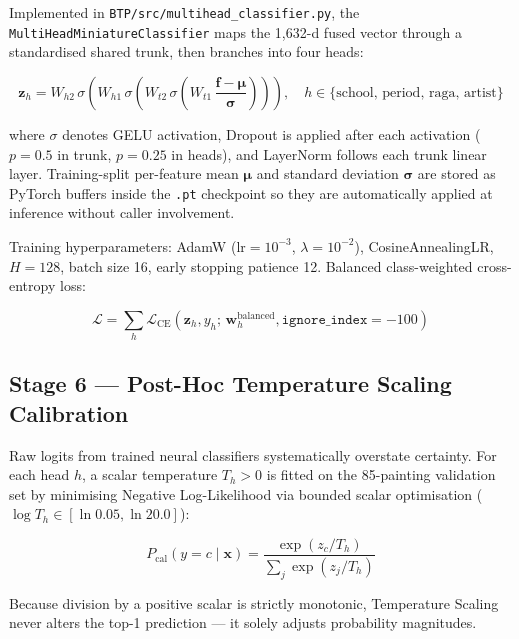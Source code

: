 \documentclass[12pt, a4paper, twoside]{article}
\begin{document}
Implemented in \texttt{BTP/src/multihead\_classifier.py}, the \texttt{MultiHeadMiniatureClassifier} maps the 1,632-d fused vector through a standardised shared trunk, then branches into four heads:

\begin{equation}
  \mathbf{z}_h = W_{h2}\,\sigma\!\left(W_{h1}\,\sigma\!\left(W_{t2}\,\sigma\!\left(W_{t1}\,\frac{\mathbf{f} - \boldsymbol{\mu}}{\boldsymbol{\sigma}}\right)\right)\right), \quad h \in \{\text{school, period, raga, artist}\}
\end{equation}

where $\sigma$ denotes GELU activation, Dropout is applied after each activation ($p = 0.5$ in trunk, $p = 0.25$ in heads), and LayerNorm follows each trunk linear layer. Training-split per-feature mean $\boldsymbol{\mu}$ and standard deviation $\boldsymbol{\sigma}$ are stored as PyTorch buffers inside the \texttt{.pt} checkpoint so they are automatically applied at inference without caller involvement.

Training hyperparameters: AdamW ($\text{lr} = 10^{-3}$, $\lambda = 10^{-2}$), CosineAnnealingLR, $H = 128$, batch size 16, early stopping patience 12. Balanced class-weighted cross-entropy loss:

\begin{equation}
  \mathcal{L} = \sum_{h} \mathcal{L}_{\text{CE}}(\mathbf{z}_h, y_h;\, \mathbf{w}_h^{\text{balanced}}, \texttt{ignore\_index}=-100)
\end{equation}

\subsection{Stage 6 — Post-Hoc Temperature Scaling Calibration}

Raw logits from trained neural classifiers systematically overstate certainty. For each head $h$, a scalar temperature $T_h > 0$ is fitted on the 85-painting validation set by minimising Negative Log-Likelihood via bounded scalar optimisation ($\log T_h \in [\ln 0.05, \ln 20.0]$):

\begin{equation}
  P_{\text{cal}}(y = c \mid \mathbf{x}) = \frac{\exp(z_c / T_h)}{\sum_j \exp(z_j / T_h)}
  \label{eq:tempcal}
\end{equation}

Because division by a positive scalar is strictly monotonic, Temperature Scaling never alters the top-1 prediction — it solely adjusts probability magnitudes.
\end{document}
